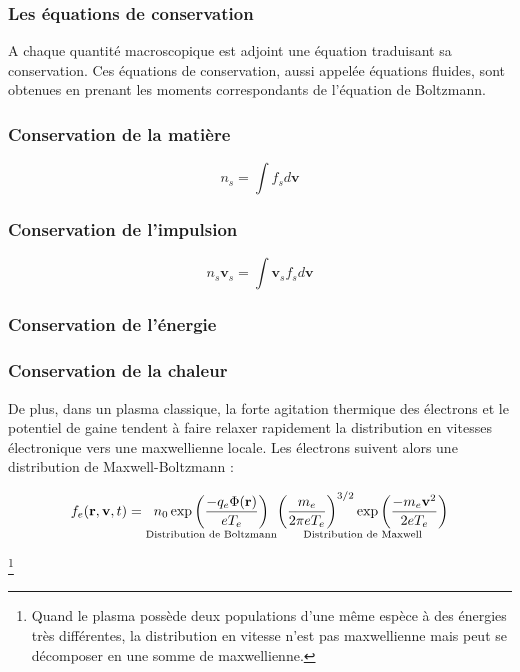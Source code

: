 \begin{refsection}
\subsubsection{Les équations de conservation}

A chaque quantité macroscopique est adjoint une équation traduisant sa
conservation. Ces équations de conservation, aussi appelée équations fluides,
sont obtenues en prenant les moments correspondants de l'équation de Boltzmann.



\subsubsection{Conservation de la matière}
$$n_s=\int f_sd\mathbf{v}$$

\subsubsection{Conservation de l'impulsion}
$$n_s\mathbf{v}_s=\int \mathbf{v}_sf_sd\mathbf{v}$$
\subsubsection{Conservation de l'énergie}
\subsubsection{Conservation de la chaleur}

De plus, dans un plasma classique,
la forte agitation thermique des électrons et le potentiel de gaine tendent à
faire relaxer rapidement la distribution en vitesses électronique vers une
maxwellienne locale. Les électrons suivent alors une distribution de Maxwell-Boltzmann :

\begin{equation}
	f_e(\mathbf{r},\mathbf{v},t)=\underset{\text{Distribution de Boltzmann}}
	{n{_{0}}\exp\left(\frac{-q_e\Phi(\mathbf r)}{eT_e}\right)}
	\underset{\text{Distribution de Maxwell}} {\left(\frac{m_e}{2\pi
	eT_e}\right)^{{3/2}}\exp\left(\frac{-m_e
	\mathbf v^{{2}}}{2eT_e}\right)}
\end{equation}
 
 
 \footnote{Quand le
plasma possède deux populations d'une même espèce à des énergies très différentes, la
distribution en vitesse n'est pas maxwellienne mais peut se décomposer en une somme de maxwellienne.}


\end{refsection}
